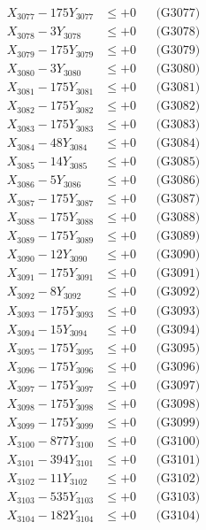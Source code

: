 \documentclass[a4paper,10pt]{article}
\begin{document}
{\begin{align}
X_{3077} - 175Y_{3077} &\leq +0 && \text{(G3077)} \\
X_{3078} - 3Y_{3078} &\leq +0 && \text{(G3078)} \\
X_{3079} - 175Y_{3079} &\leq +0 && \text{(G3079)} \\
X_{3080} - 3Y_{3080} &\leq +0 && \text{(G3080)} \\
\allowbreak
X_{3081} - 175Y_{3081} &\leq +0 && \text{(G3081)} \\
X_{3082} - 175Y_{3082} &\leq +0 && \text{(G3082)} \\
X_{3083} - 175Y_{3083} &\leq +0 && \text{(G3083)} \\
X_{3084} - 48Y_{3084} &\leq +0 && \text{(G3084)} \\
X_{3085} - 14Y_{3085} &\leq +0 && \text{(G3085)} \\
X_{3086} - 5Y_{3086} &\leq +0 && \text{(G3086)} \\
X_{3087} - 175Y_{3087} &\leq +0 && \text{(G3087)} \\
X_{3088} - 175Y_{3088} &\leq +0 && \text{(G3088)} \\
X_{3089} - 175Y_{3089} &\leq +0 && \text{(G3089)} \\
X_{3090} - 12Y_{3090} &\leq +0 && \text{(G3090)} \\
\allowbreak
X_{3091} - 175Y_{3091} &\leq +0 && \text{(G3091)} \\
X_{3092} - 8Y_{3092} &\leq +0 && \text{(G3092)} \\
X_{3093} - 175Y_{3093} &\leq +0 && \text{(G3093)} \\
X_{3094} - 15Y_{3094} &\leq +0 && \text{(G3094)} \\
X_{3095} - 175Y_{3095} &\leq +0 && \text{(G3095)} \\
X_{3096} - 175Y_{3096} &\leq +0 && \text{(G3096)} \\
X_{3097} - 175Y_{3097} &\leq +0 && \text{(G3097)} \\
X_{3098} - 175Y_{3098} &\leq +0 && \text{(G3098)} \\
X_{3099} - 175Y_{3099} &\leq +0 && \text{(G3099)} \\
X_{3100} - 877Y_{3100} &\leq +0 && \text{(G3100)} \\
\allowbreak
X_{3101} - 394Y_{3101} &\leq +0 && \text{(G3101)} \\
X_{3102} - 11Y_{3102} &\leq +0 && \text{(G3102)} \\
X_{3103} - 535Y_{3103} &\leq +0 && \text{(G3103)} \\
X_{3104} - 182Y_{3104} &\leq +0 && \text{(G3104)} \\

\end{align}}
\end{document}
